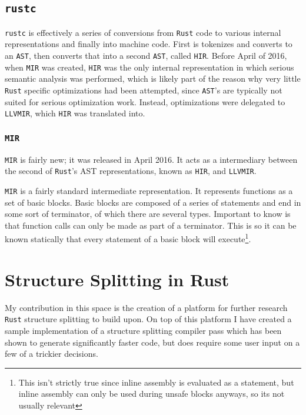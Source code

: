 \documentclass[12pt,oneside]{book}
\newcommand{\rustname}{{\texttt{Rust}}}
\def \rust {\rustname{}\xspace}
\newcommand{\rustcname}{{\texttt{rustc}}}
\def \rustc {\rustcname{}\xspace}
\newcommand{\mirname}{{\texttt{MIR}}}
\def \mir {\mirname{}\xspace}
\newcommand{\hirname}{{\texttt{HIR}}}
\def \hir {\hirname{}\xspace}
\newcommand{\llvmirname}{{\texttt{LLVMIR}}}
\def \llvmir {\llvmirname{}\xspace}
\begin{document}
\section{\rustc}
\label{sec:rustc}

\rustc is effectively a series of conversions from
\rust code to various internal representations and finally into machine code.
First is tokenizes and converts to an \texttt{AST}, then converts that into a
second \texttt{AST}, called \hir. Before April of 2016, when \mir was created,
\hir was the only
internal representation in which serious semantic analysis was performed, which
is likely part of the reason why very little \rust specific optimizations had
been attempted, since \texttt{AST}'s are typically not suited for serious
optimization work. Instead, optimizations were delegated to \llvmir, which \hir
was translated into. 

\subsection{\mir}
\mir is fairly new; it was released in April 2016\cite{mirintro}. It acts as a
intermediary between the second of \rust's AST representations, known as \hir,
and \llvmir.

\mir is a fairly standard intermediate representation. It represents functions
as a set of basic blocks. Basic blocks are composed of a series of statements
and end in some sort of terminator, of which there are several types. Important
to know is that function calls can only be made as part of a terminator. This is
so it can be known statically that every statement of a basic block will
execute\footnote{This isn't strictly true since inline assembly is evaluated as
  a statement, but inline assembly can only be used during unsafe blocks
  anyways, so its not usually relevant}.

\chapter{Structure Splitting in Rust}

My contribution in this space is the creation of a platform for further
research \rust structure splitting to build upon. On top of this platform I have
created a sample implementation of a structure splitting compiler pass which
has been shown to generate significantly faster code, but does require some user
input on a few of a trickier decisions. 
\end{document}
